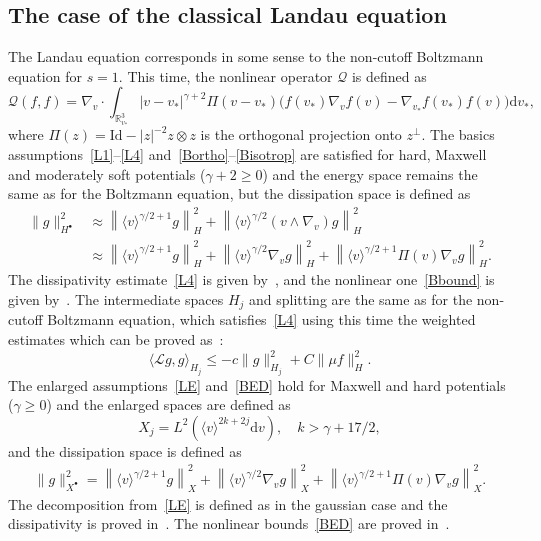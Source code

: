 \documentclass[AHL,Unicode,longabstracts,published]{cedram}
\newcommand{\Id}{\mathrm{Id}}
\renewcommand{\d}{\mathrm{d}}
\newcommand{\R}{\mathbb{R}}
\newcommand{\LL}{\mathcal{L}}
\newcommand{\QQ}{\mathcal{Q}}
\newcommand{\Ss}{H}
\newcommand{\Ssp}{H^{\bullet}}
\newcommand{\Sl}{X}
\newcommand{\Slp}{X^{\bullet}}
\renewcommand*\le{\leqslant}
\renewcommand*\ge{\geqslant}
\newcommand{\la}{\langle}
\newcommand{\ra}{\rangle}
\begin{document}
\subsection{The case of the classical Landau equation}

The Landau equation corresponds in some sense to the non-cutoff Boltzmann equation for $s = 1$. This time, the nonlinear operator $\QQ$ is defined as
\begin{equation*}
\QQ(f, f) = \nabla_v \cdot \int_{\R^3_{v_*}} | v - v_* |^{\gamma+2} \Pi(v-v_*) \Big(f(v_*) \nabla_v f(v) - \nabla_{v_*} f(v_*) f(v) \Big) \d v_*,
\end{equation*}
where $\Pi(z) = \Id - |z|^{-2} z \otimes z$ is the orthogonal projection onto $z^\perp$. The basics assumptions~\eqref{L1}--\eqref{L4} and~\eqref{Bortho}--\eqref{Bisotrop} are satisfied for hard, Maxwell and moderately soft potentials ($\gamma + 2 \ge 0$) and the energy space remains the same as for the Boltzmann equation, but the dissipation space is defined as
\begin{align*}
\| g \|^2_{\Ssp} & \approx \left\| \la v \ra^{\gamma/2 + 1} g \right\|_\Ss^2 + \left\| \la v \ra^{\gamma/2} (v \land \nabla_v) g \right\|^2_\Ss \\
& \approx \left\| \la v \ra^{\gamma/2 + 1} g \right\|_\Ss^2 + \left\| \la v \ra^{\gamma/2} \nabla_v g \right\|^2_\Ss + \left\| \la v \ra^{\gamma / 2 + 1} \Pi(v) \nabla_v g \right\|_\Ss^2.
\end{align*}
The dissipativity estimate~\eqref{L4} is given by~\cite[(24)]{G2002}, and the nonlinear one~\eqref{Bbound} is given by~\cite[Lemma~2.2]{R2021}. The intermediate spaces $\Ss_j$ and splitting are the same as for the non-cutoff Boltzmann equation, which satisfies~\eqref{L4} using this time the weighted estimates which can be proved as~\cite[Lemma~6]{G2002}:
\[
\la \LL g, g \ra_{\Ss_j} \le - c \| g \|^2_{\Ss_j} + C \| \mu f \|_{\Ss}^2.
\]
The enlarged assumptions~\eqref{LE} and~\eqref{BED} hold for Maxwell and hard potentials ($\gamma \ge 0$) and the enlarged spaces are defined as
\[
\Sl_j = L^2\left(\la v \ra^{2k + 2 j} \d v \right), \quad k > \gamma + 17/2,
\]
and the dissipation space is defined as
\begin{align*}
\| g \|^2_{\Slp} = \left\| \la v \ra^{\gamma/2 + 1} g \right\|_\Sl^2 + \left\| \la v \ra^{\gamma/2} \nabla_v g \right\|^2_\Sl + \left\| \la v \ra^{\gamma / 2 + 1} \Pi(v) \nabla_v g \right\|_\Sl^2.
\end{align*}
The decomposition from~\eqref{LE} is defined as in the gaussian case and the dissipativity is proved in~\cite[(2.22)-(2.23)]{CTW2016}. The nonlinear bounds~\eqref{BED} are proved in~\cite[Lemma~3.5]{CTW2016}.
\end{document}
